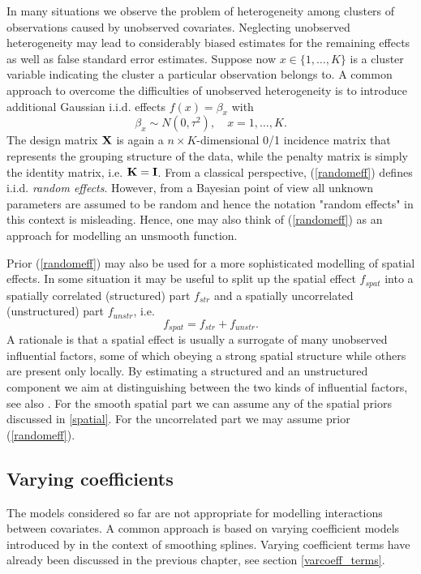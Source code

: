 \documentclass[11pt,a4paper,twoside]{bayesxarticle}
\begin{document}
In many situations we observe the problem of heterogeneity among
clusters of observations caused by unobserved covariates. Neglecting
unobserved heterogeneity may lead to considerably biased estimates
for the remaining effects as well as false standard error estimates.
Suppose now $x \in \{1,\dots,K\}$ is a cluster variable indicating the
cluster a particular observation belongs to. A common approach to
overcome the difficulties of unobserved heterogeneity is to
introduce additional Gaussian i.i.d. effects $f(x) = \beta_{x}$
with
\begin{equation}
\label{randomeff} \beta_{x} \sim N(0,\tau^2), \quad
x=1,\dots,K.
\end{equation}
The design matrix $\mathbf{X}$ is again a $n \times K$-dimensional 0/1
incidence matrix that represents the grouping structure of the data,
while the penalty matrix is simply the identity matrix, i.e.
$\mathbf{K}=\mathbf{I}$. From a classical perspective, (\ref{randomeff}) defines
i.i.d. {\em random effects}. However, from a Bayesian point of view
all unknown parameters are assumed to be random and hence the
notation "random effects" in this context is misleading. Hence, one
may also think of (\ref{randomeff}) as an approach for modelling an
unsmooth function.

Prior (\ref{randomeff}) may also be used for a more sophisticated
modelling of spatial effects. In some situation it may be useful to
split up the spatial effect $f_{spat}$ into a spatially correlated
(structured) part $f_{str}$ and a spatially uncorrelated
(unstructured) part $f_{unstr}$, i.e.
$$
f_{spat} = f_{str}+f_{unstr}.
$$
A rationale is that a spatial effect is usually a surrogate of many unobserved influential factors, some of which obeying a
strong spatial structure while others are present only locally. By estimating a structured and an unstructured component we aim
at distinguishing between the two kinds of influential factors, see also . For the smooth spatial part
we can assume any of the spatial priors discussed in \autoref{spatial}. For the uncorrelated part we may assume prior
(\ref{randomeff}).

\subsection{Varying coefficients}

The models considered so far are not appropriate for modelling interactions between covariates. A common approach is based on
varying coefficient models introduced by  in the context of smoothing splines. Varying coefficient terms
have already been discussed in the previous chapter, see section \ref{varcoeff_terms}.
\end{document}

